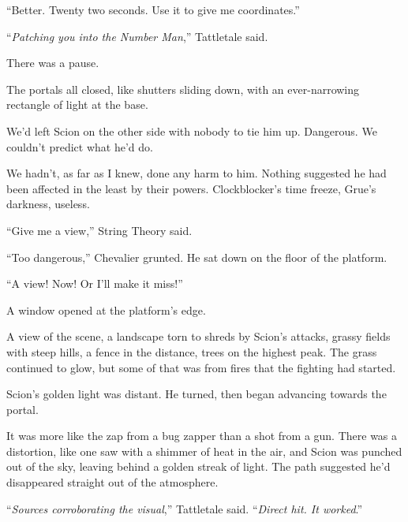 ``Better.  Twenty two seconds.  Use it to give me coordinates.''



``\emph{Patching you into the Number Man},'' Tattletale said.



There was a pause.



The portals all closed, like shutters sliding down, with an ever-narrowing rectangle of light at the base.



We'd left Scion on the other side with nobody to tie him up.  Dangerous.  We couldn't predict what he'd do.



We hadn't, as far as I knew, done any harm to him.  Nothing suggested he had been affected in the least by their powers.  Clockblocker's time freeze, Grue's darkness, useless.



``Give me a view,'' String Theory said.



``Too dangerous,'' Chevalier grunted.  He sat down on the floor of the platform.



``A view!  Now!  Or I'll make it miss!''



A window opened at the platform's edge.



A view of the scene, a landscape torn to shreds by Scion's attacks, grassy fields with steep hills, a fence in the distance, trees on the highest peak.  The grass continued to glow, but some of that was from fires that the fighting had started.



Scion's golden light was distant.  He turned, then began advancing towards the portal.



It was more like the zap from a bug zapper than a shot from a gun.  There was a distortion, like one saw with a shimmer of heat in the air, and Scion was punched out of the sky, leaving behind a golden streak of light.  The path suggested he'd disappeared straight out of the atmosphere.



``\emph{Sources corroborating the visual},'' Tattletale said.  ``\emph{Direct hit.  It worked}.''



